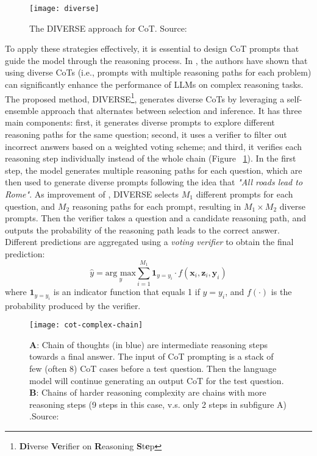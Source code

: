 \begin{figure}[h!]
	\centering
	\texttt{[image: diverse]}
	\caption{The DIVERSE approach for CoT. Source: \textcite{li2022making}}
	\label{fig:diverse}
\end{figure}

To apply these strategies effectively, it is essential to design CoT prompts that guide the model through the reasoning process.
In \textcite{li2022making}, the authors have shown that using diverse CoTs (i.e., prompts with multiple reasoning paths for each problem) can significantly enhance the performance of LLMs on complex reasoning tasks.
The proposed method, DIVERSE\footnote{\textbf{Di}verse \textbf{Ve}rifier on \textbf{R}easoning \textbf{S}t\textbf{e}p}, generates diverse CoTs by leveraging a self-ensemble approach that alternates between selection and inference.
It has three main components: first, it generates diverse prompts to explore different reasoning paths for the same question; second, it uses a verifier to filter out incorrect answers based on a weighted voting scheme; and third, it verifies each reasoning step individually instead of the whole chain (Figure ~\ref{fig:diverse}).
In the first step, the model generates multiple reasoning paths for each question, which are then used to generate diverse prompts following the idea that \textit{"All roads lead to Rome"}.
As improvement of \textcite{wang2022self}, DIVERSE selects $M_1$ different prompts for each question, and $M_2$ reasoning paths for each prompt, resulting in $M_1 \times M_2$ diverse prompts.
Then the verifier takes a question and a candidate reasoning path, and outputs the probability of the reasoning path leads to the correct answer.
Different predictions are aggregated using a \textit{voting verifier} to obtain the final prediction:
\begin{equation}
	\hat{y} = \underset{y}{\text{arg max}} \sum_{i=1}^{M_1} \textbf{1}_{y = y_{i}} \cdot f(\textbf{x}_i, \textbf{z}_i, \textbf{y}_i)
	\label{eq:diverse}
\end{equation}
where $\textbf{1}_{y = y_{i}}$ is an indicator function that equals 1 if $y = y_{i}$, and $f(\cdot)$ is the probability produced by the verifier.

\begin{figure}[h!]
	\centering
	\texttt{[image: cot-complex-chain]}
	\caption{\textbf{A}: Chain of thoughts (in blue) are intermediate reasoning steps towards a final answer. The input of CoT prompting is a stack of few (often 8) CoT cases before a test question. Then the language model will continue generating an output CoT for the test question. \textbf{B}: Chains of harder reasoning complexity are chains with more reasoning steps (9 steps in this case, v.s. only 2 steps in subfigure A) .Source: \textcite{fu2022complexity}}
	\label{fig:cot-complex-chain}
\end{figure}

